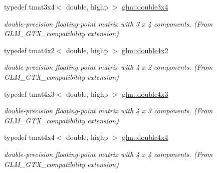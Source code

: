 \begin{DoxyCompactItemize}
typedef tmat3x4$<$ double, highp $>$ \hyperlink{group__gtx__compatibility_gaa30d4862bab3c5aa40225105a06b62cc}{glm\+::double3x4}
\begin{DoxyCompactList}\small\item\em double-\/precision floating-\/point matrix with 3 x 4 components. (From G\+L\+M\+\_\+\+G\+T\+X\+\_\+compatibility extension) \end{DoxyCompactList}\item 
typedef tmat4x2$<$ double, highp $>$ \hyperlink{group__gtx__compatibility_ga66ee22fb774d38f1484670c1afa230da}{glm\+::double4x2}
\begin{DoxyCompactList}\small\item\em double-\/precision floating-\/point matrix with 4 x 2 components. (From G\+L\+M\+\_\+\+G\+T\+X\+\_\+compatibility extension) \end{DoxyCompactList}\item 
typedef tmat4x3$<$ double, highp $>$ \hyperlink{group__gtx__compatibility_gadad0d5da7181385a05567469d4a5dd9a}{glm\+::double4x3}
\begin{DoxyCompactList}\small\item\em double-\/precision floating-\/point matrix with 4 x 3 components. (From G\+L\+M\+\_\+\+G\+T\+X\+\_\+compatibility extension) \end{DoxyCompactList}\item 
typedef tmat4x4$<$ double, highp $>$ \hyperlink{group__gtx__compatibility_ga83ac0f28025f5e999b03094400fbddcb}{glm\+::double4x4}
\begin{DoxyCompactList}\small\item\em double-\/precision floating-\/point matrix with 4 x 4 components. (From G\+L\+M\+\_\+\+G\+T\+X\+\_\+compatibility extension) \end{DoxyCompactList}\end{DoxyCompactItemize}
